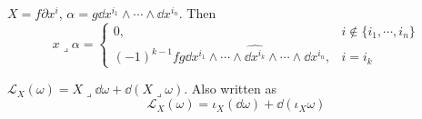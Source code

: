 \begin{example}
     $ X=f\partial x^i $,  $ \alpha=g\dd x^{i_1}\wedge\cdots\wedge\dd x^{i_n} $. Then 
     \begin{equation}
        x\mathrel{\lrcorner}\alpha=\begin{cases}
            0,&i\not\in\{i_1,\cdots,i_n\}\\
            (-1)^{k-1}fg\dd x^{i_1}\wedge\cdots\wedge\widehat{\dd x^{i_k}}\wedge\cdots\wedge \dd x^{i_n},&i=i_k
         \end{cases}\label{eq:Easy calculation of the Cartan's binary operator}
     \end{equation}
\end{example}
\begin{theorem}\label{thm:Cartan's Magical Formula}
     $ \mathcal{L}_X(\omega)=X\mathrel{\lrcorner}\dd \omega+\dd(X\mathrel{\lrcorner}\omega) $. Also written as 
     \[\mathcal{L}_X(\omega)=\iota_X(\dd \omega)+\dd(\iota_X\omega)\] 
\end{theorem}
